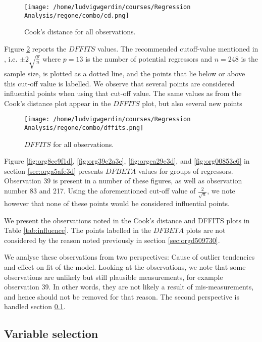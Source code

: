 \documentclass[11pt]{article}
\begin{document}
\begin{figure}[h]
\centering
\texttt{[image: /home/ludvigwgerdin/courses/Regression Analysis/regone/combo/cd.png]}
\caption{\label{fig:org6e551f1}
Cook's distance for all observations.}
\end{figure}

Figure \ref{fig:org04d73a9} reports the \(DFFITS\) values. 
The recommended cutoff-value mentioned in \cite{Montgomery2012}, i.e. \(\pm 2\sqrt{\frac{p}{n}}\)
where \(p = 13\) is the number of potential regressors and \(n = 248\) is the sample size, is 
plotted as a dotted line, and the points that lie below or above this cut-off value is labelled.
We observe that several points are considered influential points when using that cut-off value.
The same values as from the Cook's distance plot appear in the \(DFFITS\) plot, but also several 
new points

\begin{figure}[h]
\centering
\texttt{[image: /home/ludvigwgerdin/courses/Regression Analysis/regone/combo/dffits.png]}
\caption{\label{fig:org04d73a9}
\(DFFITS\) for all observations.}
\end{figure}

Figure \ref{fig:org8ce9f1d}, \ref{fig:org39c2a3e}, \ref{fig:orgea29e3d}, and
\ref{fig:org00853c6} in section \ref{sec:orga5afe3d} presents \(DFBETA\) values for groups of regressors. 
Observation 39 is present in a number of these figures, as well as observation number 83 and 217. 
Using the aforementioned cut-off value of \(\frac{2}{\sqrt{n}}\), we note however that none of these points
would be considered influential points.

We present the observations noted in the Cook's distance and DFFITS plots in Table \ref{tab:influence}.
The points labelled in the \(DFBETA\) plots are not considered by the reason noted previously 
in section \ref{sec:orgd509730}. 

We analyse these observations from two perspectives: Cause of outlier tendencies and effect on fit of 
the model. Looking at the observations, we note that some observations are unlikely but 
still plausible measurements, for example observation 39. In other words, they are not likely a result
of mis-measurements, and hence should not be removed for that reason. The second perspective is handled 
section \ref{sec:org968180a}.



\subsection{Variable selection}
\label{sec:org968180a}
\end{document}
